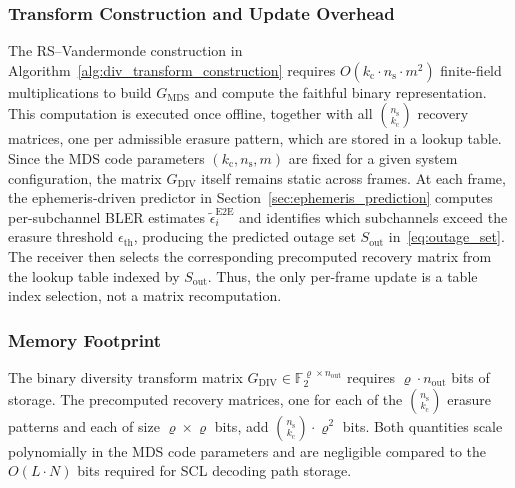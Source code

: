 \documentclass[journal]{IEEEtran}
\begin{document}
\subsubsection{Transform Construction and Update Overhead}
The RS--Vandermonde construction in
Algorithm~\ref{alg:div_transform_construction} requires
$O(k_{\mathrm{c}} \cdot n_{\mathrm{s}} \cdot m^2)$ finite-field
multiplications to build $G_{\mathrm{MDS}}$ and compute the faithful
binary representation. This computation is executed once offline,
together with all $\binom{n_{\mathrm{s}}}{k_{\mathrm{c}}}$ recovery
matrices, one per admissible erasure pattern, which are stored in a
lookup table.
Since the MDS code parameters $(k_{\mathrm{c}}, n_{\mathrm{s}}, m)$
are fixed for a given system configuration, the matrix
$G_{\mathrm{DIV}}$ itself remains static across frames.
At each frame, the ephemeris-driven predictor in
Section~\ref{sec:ephemeris_prediction} computes per-subchannel
BLER estimates $\tilde{\epsilon}_{i}^{\mathrm{E2E}}$ and
identifies which subchannels exceed the erasure threshold
$\epsilon_{\mathrm{th}}$, producing the predicted outage set
$S_{\mathrm{out}}$ in~\eqref{eq:outage_set}. The receiver then
selects the corresponding precomputed recovery matrix from the
lookup table indexed by $S_{\mathrm{out}}$. Thus, the only
per-frame update is a table index selection, not a matrix
recomputation.

\subsubsection{Memory Footprint}
The binary diversity transform matrix
$G_{\mathrm{DIV}} \in \mathbb{F}_2^{\varrho \times n_{\mathrm{out}}}$
requires $\varrho \cdot n_{\mathrm{out}}$ bits of storage.
The precomputed recovery matrices, one for each of the
$\binom{n_{\mathrm{s}}}{k_{\mathrm{c}}}$ erasure patterns and
each of size $\varrho \times \varrho$ bits, add
$\binom{n_{\mathrm{s}}}{k_{\mathrm{c}}} \cdot \varrho^2$ bits.
Both quantities scale polynomially in the MDS code parameters and
are negligible compared to the $O(L \cdot N)$ bits required for
SCL decoding path storage.
\end{document}
